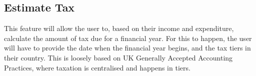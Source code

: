 
\subsection{Estimate Tax} \label{sec:AnalysisAndDesign.EstimateTax}
This feature will allow the user to, based on their income and expenditure,
calculate the amount of tax due for a financial year. For this to happen, the
user will have to provide the date when the financial year begins, and the tax
tiers in their country. This is loosely based on UK Generally Accepted
Accounting Practices, where taxation is centralised and happens in tiers.


